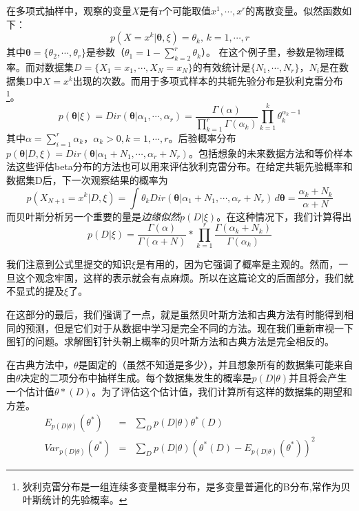 \documentclass[10pt,a4paper]{article}
\begin{document}
\begin{CJK*}{UTF8}{gkai}
在多项式抽样中，观察的变量$X$是有r个可能取值$x^1,\cdots,x^r$的离散变量。似然函数如下：
\begin{equation}
p(X=x^k|\boldsymbol{\theta},\xi)=\theta_k,\, k=1,\cdots,r \nonumber
\end{equation}
其中$\boldsymbol{\theta}=\{\theta_2,\cdots,\theta_r\}$是参数（$\theta_1=1-\sum_{k=2}^r \theta_k$）。
在这个例子里，参数是物理概率。而对数据集$D=\{X_1=x_1,\cdots,X_N=x_N\}$的有效统计是$\{N_1,\cdots,N_r\}$，$N_i$是在数据集D中$X=x^k$出现的次数。而用于多项式样本的共轭先验分布是狄利克雷分布\footnote{狄利克雷分布是一组连续多变量概率分布，是多变量普遍化的Β分布,常作为贝叶斯统计的先验概率。}。
\begin{equation}
p(\boldsymbol{\theta}|\xi)=Dir(\boldsymbol{\theta}|\alpha_1,\cdots,\alpha_r)=\frac{\Gamma(\alpha)}{\prod_{k=1}^r \Gamma(\alpha_k)}\prod_{k=1}^k \theta_k^{\alpha_k-1}
\end{equation}
其中$\alpha=\sum_{i=1}^r \alpha_k$，$\alpha_k>0,k=1,\cdots,r$。后验概率分布$p(\boldsymbol{\theta}|D,\xi)=Dir(\boldsymbol{\theta}|\alpha_1+N_1,\cdots,\alpha_r+N_r)$。包括想象的未来数据方法和等价样本法这些评估beta分布的方法也可以用来评估狄利克雷分布。在给定共轭先验概率和数据集D后，下一次观察结果的概率为
\begin{equation}
\label{eq:12}
p(X_{N+1}=x^k|D,\xi)=\int \theta_k Dir(\boldsymbol{\theta}|\alpha_1+N_1,\cdots,\alpha_r+N_r)\, d\boldsymbol{\theta}
=\frac{\alpha_k+N_k}{\alpha+N}
\end{equation}
而贝叶斯分析另一个重要的量是\textit{边缘似然}$p(D|\xi)$。在这种情况下，我们计算得出
\begin{equation}
\label{eq:13}
p(D|\xi)=\frac{\Gamma(\alpha)}{\Gamma(\alpha+N)}*\prod_{k=1}^r\frac{\Gamma(\alpha_k+N_k)}{\Gamma(\alpha_k)}
\end{equation}


我们注意到公式里提交的知识$\xi$是有用的，因为它强调了概率是主观的。然而，一旦这个观念牢固，这样的表示就会有点麻烦。所以在这篇论文的后面部分，我们就不显式的提及$\xi$了。


在这部分的最后，我们强调了一点，就是虽然贝叶斯方法和古典方法有时能得到相同的预测，但是它们对于从数据中学习是完全不同的方法。现在我们重新审视一下图钉的问题。求解图钉针头朝上概率的贝叶斯方法和古典方法是完全相反的。


在古典方法中，$\theta$是固定的（虽然不知道是多少），并且想象所有的数据集可能来自由$\theta$决定的二项分布中抽样生成。每个数据集发生的概率是$p(D|\theta)$并且将会产生一个估计值$\theta*(D)$。为了评估这个估计值，我们计算所有这样的数据集的期望和方差。
\begin{eqnarray}
\label{eq:14}
E_{p(D|\theta)}(\theta^*)&=&\sum_D p(D|\theta) \theta^*(D) \nonumber \\
Var_{p(D|\theta)}(\theta^*)&=&\sum_D p(D|\theta) (\theta^*(D)-E_{p(D|\theta)}(\theta^*))^2
\end{eqnarray}



\end{CJK*}
\end{document}
